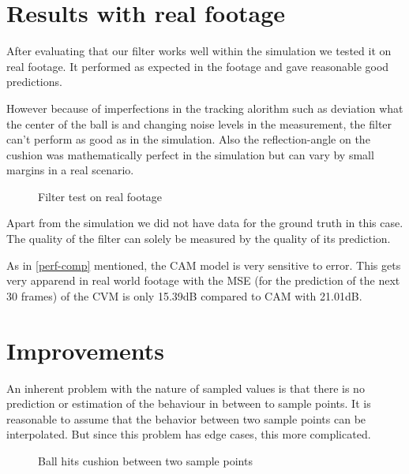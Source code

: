 \documentclass[notitlepage, a4paper, 11pt]{scrartcl}
\begin{document}
\begin{multicols}{2}
\section{Results with real footage}

After evaluating that our filter works well within the simulation we tested it on real footage. 
It performed as expected in the footage and gave reasonable good predictions.

However because of imperfections in the tracking alorithm such as deviation what the center of the ball is and changing noise levels in the measurement, 
the filter can't perform as good as in the simulation. Also the reflection-angle on the cushion was mathematically perfect in the simulation
but can vary by small margins in a real scenario.

\begin{figure}[H]
    \centering
    \caption{Filter test on real footage}
    \label{fig:realfootage}
\end{figure}

Apart from the simulation we did not have data for the ground truth in this case. 
The quality of the filter can solely be measured by the quality of its prediction. 

As in \cref{perf-comp} mentioned, the CAM model is very sensitive to error. This gets very apparend in real world footage with the MSE (for the prediction of the next 30 frames) of the CVM is only 15.39dB compared to CAM with 21.01dB.

\section{Improvements}

An inherent problem with the nature of sampled values is that there is no prediction or estimation
of the behaviour in between to sample points. It is reasonable to assume that the behavior between
two sample points can be interpolated. But since this problem has edge cases, this more complicated.

\begin{figure}[H]
    \centering
    \caption{Ball hits cushion between two sample points}
    \label{fig:edge-case}
\end{figure}


\end{multicols}
\end{document}
